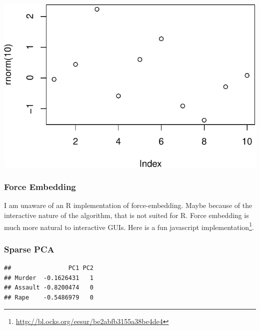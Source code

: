 \documentclass[]{book}
\newenvironment{Shaded}{\begin{snugshade}}{\end{snugshade}}
\newcommand{\CommentTok}[1]{\textcolor[rgb]{0.56,0.35,0.01}{\textit{#1}}}
\newcommand{\DataTypeTok}[1]{\textcolor[rgb]{0.13,0.29,0.53}{#1}}
\newcommand{\DecValTok}[1]{\textcolor[rgb]{0.00,0.00,0.81}{#1}}
\newcommand{\FloatTok}[1]{\textcolor[rgb]{0.00,0.00,0.81}{#1}}
\newcommand{\KeywordTok}[1]{\textcolor[rgb]{0.13,0.29,0.53}{\textbf{#1}}}
\newcommand{\NormalTok}[1]{#1}
\newcommand{\OperatorTok}[1]{\textcolor[rgb]{0.81,0.36,0.00}{\textbf{#1}}}
\newcommand{\OtherTok}[1]{\textcolor[rgb]{0.56,0.35,0.01}{#1}}
\newcommand{\StringTok}[1]{\textcolor[rgb]{0.31,0.60,0.02}{#1}}
\renewcommand{\href}[2]{#2\footnote{\url{#1}}}
\theoremstyle{definition}
\theoremstyle{definition}
\theoremstyle{definition}
\theoremstyle{remark}
\begin{document}
\includegraphics[width=0.5\linewidth]{Rcourse_files/figure-latex/unnamed-chunk-258-1}

\hypertarget{force-embedding}{%
\subsubsection{Force Embedding}\label{force-embedding}}

I am unaware of an R implementation of force-embedding.
Maybe because of the interactive nature of the algorithm, that is not suited for R.
Force embedding is much more natural to interactive GUIs.
Here is a fun \href{http://bl.ocks.org/eesur/be2abfb3155a38be4de4}{javascript implementation}.

\hypertarget{sparse-pca}{%
\subsubsection{Sparse PCA}\label{sparse-pca}}

\begin{Shaded}
\end{Shaded}

\begin{verbatim}
##                PC1 PC2
## Murder  -0.1626431   1
## Assault -0.8200474   0
## Rape    -0.5486979   0
\end{verbatim}
\end{document}
